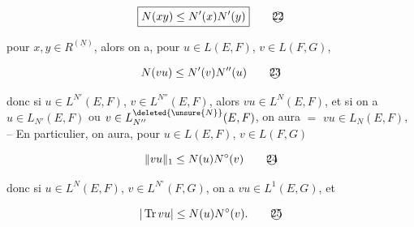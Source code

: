 \[
\boxed{N(xy)\leq N'(x)N'(y)}\tag*{\textcircled{22}}
\]

pour $x,y\in R^{(\underline N)}$, alors on a, pour $u\in L(E,F)$, $v\in L(F,G)$,

\[
N(vu)\leq N'(v)N''(u)\tag*{\textcircled{23}}
\]

donc si $u\in L^{N'}(E,F)$, $v\in L^{N''}(E,F)$, alors $vu\in L^N(E,F)$, et si on a  $u\in L_{N'}(E,F)$ ou $v\in L_{N''}^{\deleted{\unsure{N}}}(E,F)$, on aura $=$ $vu\in L_N(E,F)$, -- En particulier, on aura, pour $u\in L(E,F)$, $v\in L(F,G)$

\[
\lVert vu\rVert_1\leq N(u)N^\circ(v)\tag*{\textcircled{24}}
\]

donc si $u\in L^N(E,F)$, $v\in L^{N^\circ}(F,G)$, on a $vu\in L^1(E,G)$, et

\[
|\operatorname{Tr}vu|\leq N(u)N^\circ(v).\tag*{\textcircled{25}}
\]
